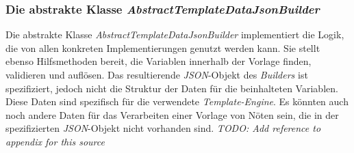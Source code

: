 \subsubsection{Die abstrakte Klasse \emph{AbstractTemplateDataJsonBuilder}}
\label{sec:abstractTemplateDataJsonBuilder}
Die abstrakte Klasse \emph{AbstractTemplateDataJsonBuilder} implementiert die Logik, die von allen konkreten Implementierungen genutzt werden kann. Sie stellt ebenso Hilfsmethoden bereit, die Variablen innerhalb der Vorlage finden, validieren und auflösen. Das resultierende \emph{JSON}-Objekt des \emph{Builders} ist spezifiziert, jedoch nicht die Struktur der Daten für die beinhalteten Variablen. Diese Daten sind spezifisch für die verwendete \emph{Template-Engine}. Es könnten auch noch andere Daten für das Verarbeiten einer Vorlage von Nöten sein, die in der spezifizierten \emph{JSON}-Objekt nicht vorhanden sind. 
\newline 
\newline  
\emph{TODO: Add reference to appendix for this source}





